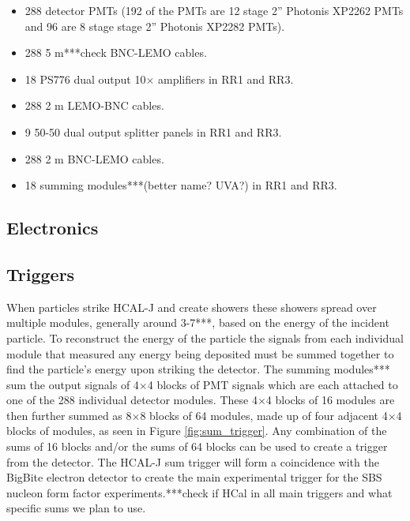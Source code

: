 \documentclass[review]{elsarticle}
\newcommand{\hcal}{HCAL-J }
\begin{document}
\begin{itemize}\itemsep6pt \parskip0pt 
	\item 288 detector PMTs (192 of the PMTs are 12 stage 2'' Photonis XP2262 PMTs and 96 are 8 stage stage 2'' Photonis XP2282 PMTs).
	\item 288 5 m***check BNC-LEMO cables. 
	\item 18 PS776 dual output 10$\times$ amplifiers in RR1 and RR3.
	\item 288 2 m LEMO-BNC cables. 
	\item 9 50-50 dual output splitter panels in RR1 and RR3. 
	\item 288 2 m BNC-LEMO cables.
	\item 18 summing modules***(better name? UVA?) in RR1 and RR3.
\end{itemize}

\subsection{Electronics}
\label{electronics}

\subsection{Triggers}
\label{triggers}

When particles strike \hcal and create showers these showers spread over multiple modules, generally around 3-7***, based on the energy of the incident particle. To reconstruct the energy of the particle the signals from each individual module that measured any energy being deposited must be summed together to find the particle's energy upon striking the detector. The summing modules*** sum the output signals of 4$\times$4 blocks of PMT signals which are each attached to one of the 288 individual detector modules. These 4$\times$4 blocks of 16 modules are then further summed as 8$\times$8 blocks of 64 modules, made up of four adjacent 4$\times$4 blocks of modules, as seen in Figure \ref{fig:sum_trigger}. Any combination of the sums of 16 blocks and/or the sums of 64 blocks can be used to create a trigger from the detector. The \hcal sum trigger will form a coincidence with the BigBite electron detector to create the main experimental trigger for the SBS nucleon form factor experiments.***check if HCal in all main triggers and what specific sums we plan to use.
\end{document}

